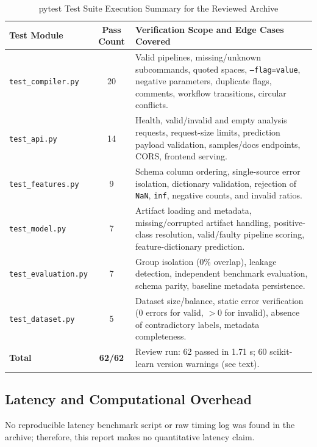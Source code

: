 \documentclass[12pt,a4paper]{article}
\begin{document}
\begin{table}[H]
\centering
\footnotesize
\setlength{\tabcolsep}{4pt}
\renewcommand{\arraystretch}{1.15}
\caption{pytest Test Suite Execution Summary for the Reviewed Archive}
\label{tab:test_suite}
\begin{tabularx}{\textwidth}{>{\raggedright\arraybackslash}p{3.8cm}c>{\raggedright\arraybackslash}X}
\toprule
\textbf{Test Module} & \textbf{Pass Count} & \textbf{Verification Scope and Edge Cases Covered} \\
\midrule
\texttt{test\_compiler.py} & 20 & Valid pipelines, missing/unknown subcommands, quoted spaces, \texttt{--flag=value}, negative parameters, duplicate flags, comments, workflow transitions, circular conflicts. \\
\addlinespace
\texttt{test\_api.py} & 14 & Health, valid/invalid and empty analysis requests, request-size limits, prediction payload validation, samples/docs endpoints, CORS, frontend serving. \\
\addlinespace
\texttt{test\_features.py} & 9 & Schema column ordering, single-source error isolation, dictionary validation, rejection of \texttt{NaN}, \texttt{inf}, negative counts, and invalid ratios. \\
\addlinespace
\texttt{test\_model.py} & 7 & Artifact loading and metadata, missing/corrupted artifact handling, positive-class resolution, valid/faulty pipeline scoring, feature-dictionary prediction. \\
\addlinespace
\texttt{test\_evaluation.py} & 7 & Group isolation ($0\%$ overlap), leakage detection, independent benchmark evaluation, schema parity, baseline metadata persistence. \\
\addlinespace
\texttt{test\_dataset.py} & 5 & Dataset size/balance, static error verification ($0$ errors for valid, $>0$ for invalid), absence of contradictory labels, metadata completeness. \\
\midrule
\textbf{Total} & \textbf{62/62} & Review run: 62 passed in 1.71 s; 60 scikit-learn version warnings (see text). \\
\bottomrule
\end{tabularx}
\end{table}

\subsection{Latency and Computational Overhead}

No reproducible latency benchmark script or raw timing log was found in the archive; therefore, this report makes no quantitative latency claim.
\end{document}

